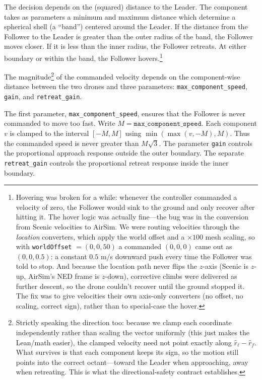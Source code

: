 \documentclass{article}
\begin{document}
The decision depends on the (squared) distance to the Leader. The component takes as parameters a minimum and maximum distance which determine a spherical shell (a ``band'') centered around the Leader. If the distance from the Follower to the Leader is greater than the outer radius of the band, the Follower moves closer. If it is less than the inner radius, the Follower retreats. At either boundary or within the band, the Follower hovers.\footnote{Hovering was broken for a while: whenever the controller commanded a velocity of zero, the Follower would sink to the ground and only recover after hitting it. The hover logic was actually fine---the bug was in the conversion from Scenic velocities to AirSim. We were routing velocities through the \emph{location} converters, which apply the world offset and a $\times 100$ mesh scaling, so with \texttt{worldOffset} $= (0, 0, 50)$ a commanded $(0,0,0)$ came out as $(0, 0, 0.5)$: a constant $0.5$ m/s downward push every time the Follower was told to stop. And because the location path never flips the $z$-axis (Scenic is $z$-up, AirSim's NED frame is $z$-down), corrective climbs were delivered as further descent, so the drone couldn't recover until the ground stopped it. The fix was to give velocities their own axis-only converters (no offset, no scaling, correct sign), rather than to special-case the hover.}

The magnitude\footnote{Strictly speaking the direction too: because we clamp each coordinate independently rather than scaling the vector uniformly (this just makes the Lean/math easier), the clamped velocity need not point exactly along $\hat r_\ell - \hat r_f$. What survives is that each component keeps its sign, so the motion still points into the correct octant—toward the Leader when approaching, away when retreating. This is what the directional-safety contract establishes.} of the commanded velocity depends on the component-wise distance between the two drones and three parameters: \texttt{max\_component\_speed}, \texttt{gain}, and \texttt{retreat\_gain}.

The first parameter, \texttt{max\_component\_speed}, ensures that the Follower is never commanded to move too fast. Write $M = \texttt{max\_component\_speed}$. Each component $v$ is clamped to the interval $[-M,M]$ using $\min(\max(v,-M),M)$. Thus the commanded speed is never greater than $M\sqrt{3}$. The parameter \texttt{gain} controls the proportional approach response outside the outer boundary. The separate \texttt{retreat\_gain} controls the proportional retreat response inside the inner boundary.
\end{document}
